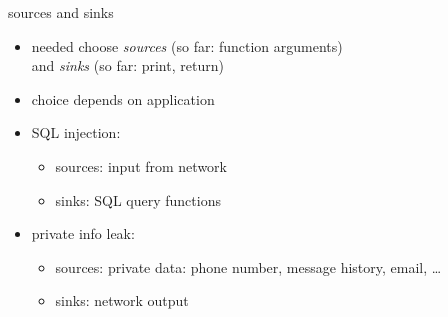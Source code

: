 \begin{frame}{sources and sinks}
    \begin{itemize}
    \item needed choose \textit{sources} (so far: function arguments) \\
          and \textit{sinks} (so far: print, return)
    \item choice depends on application
    \item SQL injection: 
        \begin{itemize}
        \item sources: input from network
        \item sinks: SQL query functions
        \end{itemize}
    \item private info leak:
        \begin{itemize}
        \item sources: private data: phone number, message history, email, \ldots
        \item sinks: network output
        \end{itemize}
    \end{itemize}
\end{frame}
